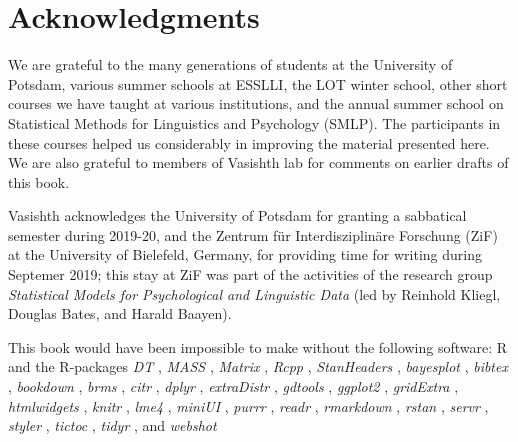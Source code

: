 \documentclass[12pt,]{krantz}
\theoremstyle{definition}
\theoremstyle{definition}
\theoremstyle{definition}
\theoremstyle{remark}
\begin{document}
\hypertarget{acknowledgments}{%
\section{Acknowledgments}\label{acknowledgments}}

We are grateful to the many generations of students at the University of Potsdam, various summer schools at ESSLLI, the LOT winter school, other short courses we have taught at various institutions, and the annual summer school on Statistical Methods for Linguistics and Psychology (SMLP). The participants in these courses helped us considerably in improving the material presented here. We are also grateful to members of Vasishth lab for comments on earlier drafts of this book.

Vasishth acknowledges the University of Potsdam for granting a sabbatical semester during 2019-20, and the Zentrum für Interdisziplinäre Forschung (ZiF) at the University of Bielefeld, Germany, for providing time for writing during Septemer 2019; this stay at ZiF was part of the activities of the research group \emph{Statistical Models for Psychological and Linguistic Data} (led by Reinhold Kliegl, Douglas Bates, and Harald Baayen).

This book would have been impossible to make without the following software: R \citep[Version 3.6.1;][]{R-base} and the R-packages \emph{DT} \citep[Version 0.10;][]{R-DT}, \emph{MASS} \citep[Version 7.3.51.4;][]{R-MASS}, \emph{Matrix} \citep[Version 1.2.18;][]{R-Matrix}, \emph{Rcpp} \citep[Version 1.0.3;][]{R-Rcpp}, \emph{StanHeaders} \citep[Version 2.19.0;][]{R-StanHeaders}, \emph{bayesplot} \citep[Version 1.7.1;][]{R-bayesplot}, \emph{bibtex} \citep[Version 0.4.2;][]{R-bibtex}, \emph{bookdown} \citep[Version 0.16;][]{R-bookdown}, \emph{brms} \citep[Version 2.10.0;][]{R-brms}, \emph{citr} \citep[Version 0.3.2;][]{R-citr}, \emph{dplyr} \citep[Version 0.8.3;][]{R-dplyr}, \emph{extraDistr} \citep[Version 1.8.11;][]{R-extraDistr}, \emph{gdtools} \citep[Version 0.2.1;][]{R-gdtools}, \emph{ggplot2} \citep[Version 3.2.1;][]{R-ggplot2}, \emph{gridExtra} \citep[Version 2.3;][]{R-gridExtra}, \emph{htmlwidgets} \citep[Version 1.5.1;][]{R-htmlwidgets}, \emph{knitr} \citep[Version 1.26;][]{R-knitr}, \emph{lme4} \citep[Version 1.1.21;][]{R-lme4}, \emph{miniUI} \citep[Version 0.1.1.1;][]{R-miniUI}, \emph{purrr} \citep[Version 0.3.3;][]{R-purrr}, \emph{readr} \citep[Version 1.3.1;][]{R-readr}, \emph{rmarkdown} \citep[Version 1.18;][]{R-rmarkdown}, \emph{rstan} \citep[Version 2.19.2;][]{R-rstan}, \emph{servr} \citep[Version 0.15;][]{R-servr}, \emph{styler} \citep[Version 1.2.0;][]{R-styler}, \emph{tictoc} \citep[Version 1.0;][]{R-tictoc}, \emph{tidyr} \citep[Version 1.0.0;][]{R-tidyr}, and \emph{webshot} \citep[Version 0.5.2;][]{R-webshot}
\end{document}
